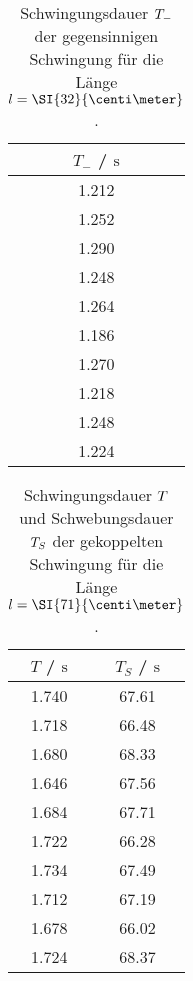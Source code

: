 \begin{table}
    \centering
    \caption{Schwingungsdauer $\protect T_{-}$ der gegensinnigen Schwingung für \hspace{\textwidth} 
    die Länge $\protect l = \SI{32}{\centi\meter}$.}
    \label{tab:t-_32}
    \begin{tabular}{c}
        \toprule
        $T_{-}$ / $\si{\second}$\\
        \midrule
        1.212\\
        1.252\\
        1.290\\
        1.248\\
        1.264\\
        1.186\\
        1.270\\
        1.218\\
        1.248\\
        1.224\\ 
        \bottomrule
    \end{tabular}
\end{table}

\begin{table}
    \centering
    \caption{Schwingungsdauer $\protect T$ und Schwebungsdauer $\protect T_{S}$ der gekoppelten Schwingung \hspace{\textwidth}
    für die Länge  $\protect l = \SI{71}{\centi\meter}$.}
    \label{tab:tundts-_71}
    \begin{tabular}{c | c}
        \toprule
        $T$ / $\si{\second}$ & $T_{S}$ / $\si{\second}$\\
        \midrule
         1.740  &   67.61 \\    
         1.718 &   66.48 \\    
         1.680  &   68.33 \\    
         1.646 &   67.56 \\    
         1.684 &   67.71 \\    
         1.722 &   66.28 \\    
         1.734 &   67.49 \\    
         1.712 &   67.19 \\    
         1.678 &   66.02 \\    
         1.724 &   68.37 \\    
        \bottomrule
    \end{tabular}
\end{table}

